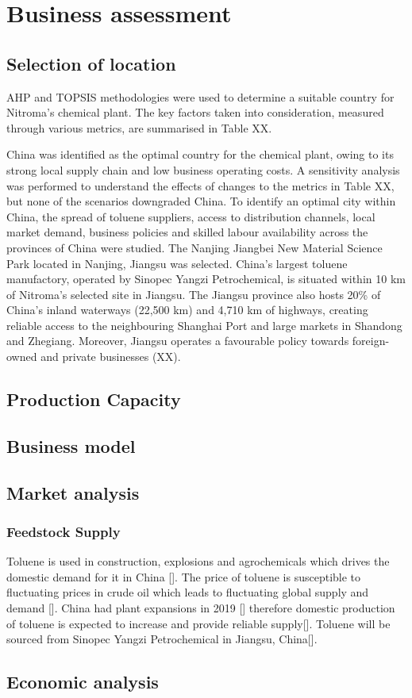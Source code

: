 \section{Business assessment}
\label{sec:economics}
\subsection{Selection of location} 
AHP and TOPSIS methodologies were used to determine a suitable country for Nitroma’s chemical plant. The key factors taken into consideration, measured through various metrics, are summarised in Table XX.

China was identified as the optimal country for the chemical plant, owing to its strong local supply chain and low business operating costs. A sensitivity analysis was performed to understand the effects of changes to the metrics in Table XX, but none of the scenarios downgraded China. To identify an optimal city within China, the spread of toluene suppliers, access to distribution channels, local market demand, business policies and skilled labour availability across the provinces of China were studied. The Nanjing Jiangbei New Material Science Park located in Nanjing, Jiangsu was selected. China’s largest toluene manufactory, operated by Sinopec Yangzi Petrochemical, is situated within 10 km of Nitroma’s selected site in Jiangsu. The Jiangsu province also hosts 20\% of China’s inland waterways (22,500 km) and 4,710 km of highways, creating reliable access to the neighbouring Shanghai Port and large markets in Shandong and Zhegiang. Moreover, Jiangsu operates a favourable policy towards foreign-owned and private businesses (XX). 

\subsection{Production Capacity}

\subsection{Business model} 

\subsection{Market analysis}

\subsubsection{Feedstock Supply}
Toluene is used in construction, explosions and agrochemicals which drives the domestic demand for it in China []. The price of toluene is susceptible to fluctuating prices in crude oil which leads to fluctuating global supply and demand []. China had plant expansions in 2019 [] therefore domestic production of toluene is expected to increase and provide reliable supply[]. Toluene will be sourced from Sinopec Yangzi Petrochemical in Jiangsu, China[].

\subsection{Economic analysis}